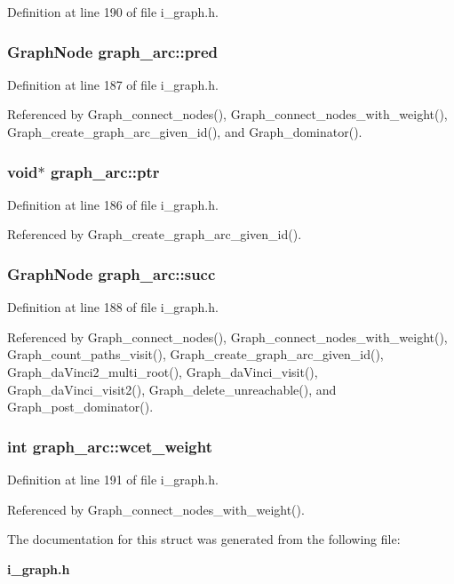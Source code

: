 Definition at line 190 of file i\_\-graph.h.
\subsubsection{\setlength{\rightskip}{0pt plus 5cm}\bf{Graph\-Node} \bf{graph\_\-arc::pred}}\label{structgraph__arc_cd15143c9412cd6920dc6e4b83322cca}




Definition at line 187 of file i\_\-graph.h.

Referenced by Graph\_\-connect\_\-nodes(), Graph\_\-connect\_\-nodes\_\-with\_\-weight(), Graph\_\-create\_\-graph\_\-arc\_\-given\_\-id(), and Graph\_\-dominator().
\subsubsection{\setlength{\rightskip}{0pt plus 5cm}void$\ast$ \bf{graph\_\-arc::ptr}}\label{structgraph__arc_e75d3e01da7c34cb851150919caa4f02}




Definition at line 186 of file i\_\-graph.h.

Referenced by Graph\_\-create\_\-graph\_\-arc\_\-given\_\-id().
\subsubsection{\setlength{\rightskip}{0pt plus 5cm}\bf{Graph\-Node} \bf{graph\_\-arc::succ}}\label{structgraph__arc_0168ea8c0836c2c0470d78cc727223ae}




Definition at line 188 of file i\_\-graph.h.

Referenced by Graph\_\-connect\_\-nodes(), Graph\_\-connect\_\-nodes\_\-with\_\-weight(), Graph\_\-count\_\-paths\_\-visit(), Graph\_\-create\_\-graph\_\-arc\_\-given\_\-id(), Graph\_\-da\-Vinci2\_\-multi\_\-root(), Graph\_\-da\-Vinci\_\-visit(), Graph\_\-da\-Vinci\_\-visit2(), Graph\_\-delete\_\-unreachable(), and Graph\_\-post\_\-dominator().
\subsubsection{\setlength{\rightskip}{0pt plus 5cm}int \bf{graph\_\-arc::wcet\_\-weight}}\label{structgraph__arc_87fc060cfe2b853c27c390baae3abd5f}




Definition at line 191 of file i\_\-graph.h.

Referenced by Graph\_\-connect\_\-nodes\_\-with\_\-weight().

The documentation for this struct was generated from the following file:\begin{CompactItemize}
\item 
\bf{i\_\-graph.h}\end{CompactItemize}
